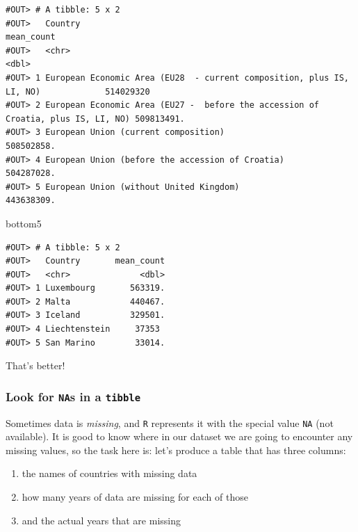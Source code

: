 \documentclass[]{book}
\newenvironment{Shaded}{\begin{snugshade}}{\end{snugshade}}
\newcommand{\NormalTok}[1]{#1}
\providecommand{\tightlist}{%
  \setlength{\itemsep}{0pt}\setlength{\parskip}{0pt}}
\begin{document}
\begin{verbatim}
#OUT> # A tibble: 5 x 2
#OUT>   Country                                                                           mean_count
#OUT>   <chr>                                                                                  <dbl>
#OUT> 1 European Economic Area (EU28  - current composition, plus IS, LI, NO)             514029320 
#OUT> 2 European Economic Area (EU27 -  before the accession of Croatia, plus IS, LI, NO) 509813491.
#OUT> 3 European Union (current composition)                                              508502858.
#OUT> 4 European Union (before the accession of Croatia)                                  504287028.
#OUT> 5 European Union (without United Kingdom)                                           443638309.
\end{verbatim}

\begin{Shaded}
\begin{Highlighting}[]
\NormalTok{bottom5}
\end{Highlighting}
\end{Shaded}

\begin{verbatim}
#OUT> # A tibble: 5 x 2
#OUT>   Country       mean_count
#OUT>   <chr>              <dbl>
#OUT> 1 Luxembourg       563319.
#OUT> 2 Malta            440467.
#OUT> 3 Iceland          329501.
#OUT> 4 Liechtenstein     37353 
#OUT> 5 San Marino        33014.
\end{verbatim}

That's better!

\hypertarget{look-for-nas-in-a-tibble}{%
\subsubsection*{\texorpdfstring{Look for \texttt{NA}s in a \texttt{tibble}}{Look for NAs in a tibble}}\label{look-for-nas-in-a-tibble}}

Sometimes data is \emph{missing}, and \texttt{R} represents it with the special value \texttt{NA} (not available). It is good to know where in our dataset we are going to encounter any missing values, so the task here is: let's produce a table that has three columns:

\begin{enumerate}
\def\labelenumi{\arabic{enumi}.}
\tightlist
\item
  the names of countries with missing data
\item
  how many years of data are missing for each of those
\item
  and the actual years that are missing
\end{enumerate}
\end{document}
